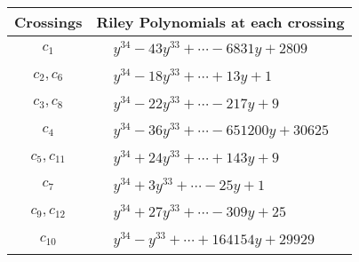 \documentclass[1p]{elsarticle_modified}
\theoremstyle{definition}
\begin{document}
\begin{tabular}{m{50pt}|m{274pt}}
Crossings & \hspace{64pt}Riley Polynomials at each crossing \\
\hline $$\begin{aligned}c_{1}\end{aligned}$$&$\begin{aligned}
&y^{34}-43 y^{33}+\cdots-6831 y+2809
\end{aligned}$\\
\hline $$\begin{aligned}c_{2},c_{6}\end{aligned}$$&$\begin{aligned}
&y^{34}-18 y^{33}+\cdots+13 y+1
\end{aligned}$\\
\hline $$\begin{aligned}c_{3},c_{8}\end{aligned}$$&$\begin{aligned}
&y^{34}-22 y^{33}+\cdots-217 y+9
\end{aligned}$\\
\hline $$\begin{aligned}c_{4}\end{aligned}$$&$\begin{aligned}
&y^{34}-36 y^{33}+\cdots-651200 y+30625
\end{aligned}$\\
\hline $$\begin{aligned}c_{5},c_{11}\end{aligned}$$&$\begin{aligned}
&y^{34}+24 y^{33}+\cdots+143 y+9
\end{aligned}$\\
\hline $$\begin{aligned}c_{7}\end{aligned}$$&$\begin{aligned}
&y^{34}+3 y^{33}+\cdots-25 y+1
\end{aligned}$\\
\hline $$\begin{aligned}c_{9},c_{12}\end{aligned}$$&$\begin{aligned}
&y^{34}+27 y^{33}+\cdots-309 y+25
\end{aligned}$\\
\hline $$\begin{aligned}c_{10}\end{aligned}$$&$\begin{aligned}
&y^{34}- y^{33}+\cdots+164154 y+29929
\end{aligned}$\\
\hline
\end{tabular}\\~\\
\end{document}
